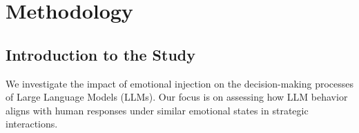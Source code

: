 \documentclass{article}
\begin{document}







\section{Methodology}

\subsection{Introduction to the Study}
We investigate the impact of emotional injection on the decision-making processes of Large Language Models (LLMs). Our focus is on assessing how LLM behavior aligns with human responses under similar emotional states in strategic interactions.
\end{document}
